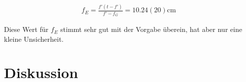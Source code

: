 \documentclass[11pt, a4paper]{article}
\begin{document}
    \begin{align}
        f_E = \frac{f' \left(t - f'\right)}{f' - f_G} = 10.24(20) \si{\centi\metre}
    \end{align}

    Diese Wert für $f_E$ stimmt sehr gut mit der Vorgabe überein, hat aber nur eine kleine Unsicherheit.






    \section{Diskussion}

    
    
\end{document}
